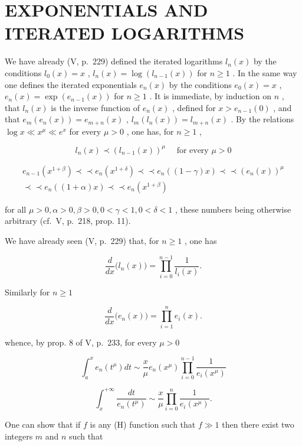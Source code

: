 \section{EXPONENTIALS AND ITERATED LOGARITHMS}

We have already (V, p.~229) defined the iterated logarithms \(l_n(x)\) by the conditions \(l_0(x) = x\) , \(l_n(x) = \log(l_{n-1}(x))\) for \(n \geqslant 1\) . In the same way one defines the iterated exponentials \(e_n(x)\) by the conditions \(e_0(x) = x\) , \(e_n(x) = \exp(e_{n-1}(x))\) for \(n \geqslant 1\) . It is immediate, by induction on \(n\) , that \(l_n(x)\) is the inverse function of \(e_n(x)\) , defined for \(x > e_{n-1}(0)\) , and that \(e_m(e_n(x)) = e_{m+n}(x)\) , \(l_m(l_n(x)) = l_{m+n}(x)\) . By the relations \(\log x \ll x^\mu \ll e^x\) for every \(\mu > 0\) , one has, for \(n \geqslant 1\) ,

\[
l _ {n} (x) \prec (l _ {n - 1} (x)) ^ {\mu} \quad \text {   for   every   } \mu > 0\tag{5}
\]

\[
\begin{array}{c} e _ {n - 1} (x ^ {1 + \beta}) \prec \prec e _ {n} (x ^ {1 + \delta}) \prec \prec e _ {n} ((1 - \gamma) x) \prec \prec (e _ {n} (x)) ^ {\mu} \\ \prec \prec e _ {n} ((1 + \alpha) x) \prec \prec e _ {n} (x ^ {1 + \beta}) \end{array}\tag{6}
\]

for all \(\mu > 0, \alpha > 0, \beta > 0, 0 < \gamma < 1, 0 < \delta < 1\) , these numbers being otherwise arbitrary (cf.~V, p.~218, prop. 11).

We have already seen (V, p.~229) that, for \(n \geqslant 1\) , one has

\[
{\frac {d}{d x}} \big (l _ {n} (x) \big) = \prod_ {i = 0} ^ {n - 1} {\frac {1}{l _ {i} (x)}}.\tag{7}
\]

Similarly for \(n\geqslant 1\)

\[
\frac {d}{d x} \big (e _ {n} (x) \big) = \prod_ {i = 1} ^ {n} e _ {i} (x).\tag{8}
\]

whence, by prop. 8 of V, p.~233, for every \(\mu > 0\)

\[
\int_ {a} ^ {x} e _ {n} (t ^ {\mu}) d t \sim \frac {x}{\mu} e _ {n} (x ^ {\mu}) \prod_ {i = 0} ^ {n - 1} \frac {1}{e _ {i} (x ^ {\mu})}\tag{9}
\]

\[
\int_ {x} ^ {+ \infty} \frac {d t}{e _ {n} (t ^ {\mu})} \sim \frac {x}{\mu} \prod_ {i = 0} ^ {n} \frac {1}{e _ {i} (x ^ {\mu})}.\tag{10}
\]

One can show that if \(f\) is any (H) function such that \(f \gg 1\) then there exist two integers \(m\) and \(n\) such that

